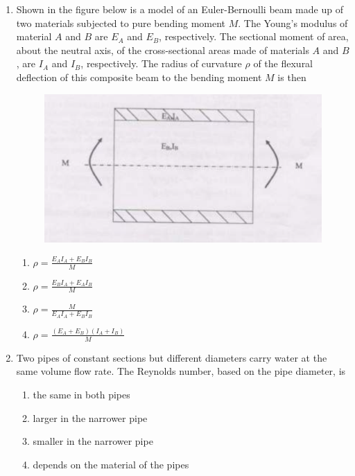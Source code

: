 \documentclass[journal]{IEEEtran}
\begin{document}
\begin{enumerate}
		\item Shown in the figure below is a model of an Euler-Bernoulli beam made up of two materials subjected to pure bending moment $M$. The Young's modulus of material $A$ and $B$ are $E_A$ and $E_B$, respectively. The sectional moment of area, about the neutral axis, of the cross-sectional areas made of materials $A$ and $B$, are $I_A$ and $I_B$, respectively. The radius of curvature $\rho$ of the flexural deflection of this composite beam to the bending moment $M$ is then

		\begin{figure}[H]
			\centering
			\includegraphics[width=\textwidth]{figs/25.png}
			\caption{}
		\end{figure}


		\begin{enumerate}
    			\item $ \rho = \frac{E_A I_A + E_B I_B}{M} $
   			\item $ \rho = \frac{E_B I_A + E_A I_B}{M} $
  			\item $ \rho = \frac{M}{E_A I_A + E_B I_B} $
  			\item $ \rho = \frac{(E_A + E_B)(I_A + I_B)}{M} $
		\end{enumerate}


	\item Two pipes of constant sections but different diameters carry water at the same volume flow rate. The Reynolds number, based on the pipe diameter, is
		\begin{enumerate}
    			\item the same in both pipes
    			\item larger in the narrower pipe
    			\item smaller in the narrower pipe
    			\item depends on the material of the pipes
		\end{enumerate}


\end{enumerate}
\end{document}
